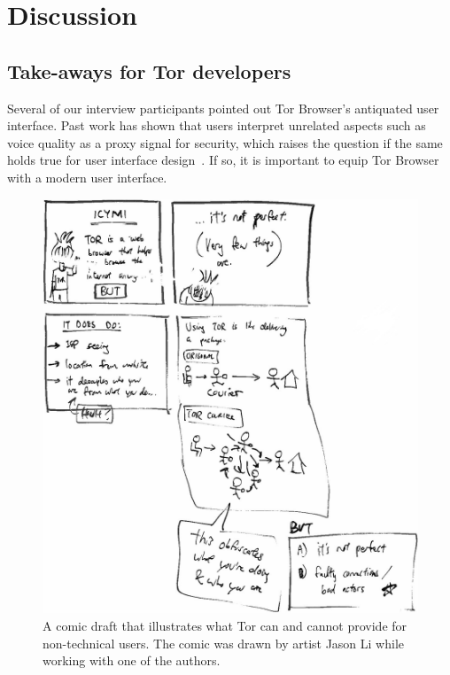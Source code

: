\section{Discussion}
\label{sec:discussion}

\subsection{Take-aways for Tor developers}

Several of our interview participants pointed out Tor Browser's antiquated user
interface.  Past work has shown that users interpret unrelated aspects such as
voice quality as a proxy signal for security, which raises the question if the
same holds true for user interface design~\cite[\S~IV.A]{Abu-Salma2017a}.  If
so, it is important to equip Tor Browser with a modern user interface.

\begin{figure}[t]
    \centering
    \includegraphics[width=\linewidth]{figures/tor-comic.jpg}
    \caption{A comic draft that illustrates what Tor can and cannot provide for
        non-technical users.  The comic was drawn by artist Jason Li while
        working with one of the authors.}
    \label{fig:tor-comic}
\end{figure}

